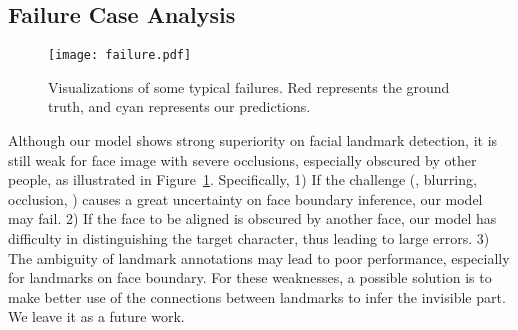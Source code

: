 \begin{table}[!t]\centering
    \vspace{-3mm}
    \caption{Another group of cross-dataset evaluation. \textbf{DTLD-s} is our proposed DTLD model trained from scratch. The methods marked with * are pretrained on 300W-LP-2D. Our DTLD exceeds previous models without pretraining and is even better than some models pretrained on 300W-LP-2D. }
    \label{crossdata2}
\end{table}


\subsection{Failure Case Analysis}
\label{Sec:limit}

\begin{figure}[t!]
    \centering
        \texttt{[image: failure.pdf]}
    \caption{Visualizations of some typical failures. \textcolor[rgb]{1,0,0}{Red} represents the ground truth, and \textcolor[rgb]{0,1,1}{cyan} represents our predictions.}
\label{failure}
\end{figure}

Although our model shows strong superiority on facial landmark detection, it is still weak for face image with severe occlusions, especially obscured by other people, as illustrated in Figure~\ref{failure}. Specifically, 1) If the challenge (\ie, blurring, occlusion, \etc) causes a great uncertainty on face boundary inference, our model may fail. 2) If the face to be aligned is obscured by another face, our model has difficulty in distinguishing the target character, thus leading to large errors. 3) The ambiguity of landmark annotations may lead to poor performance, especially for landmarks on face
boundary.
For these weaknesses, a possible solution is to make better use of the connections between landmarks to infer the invisible part. We leave it as a future work.
